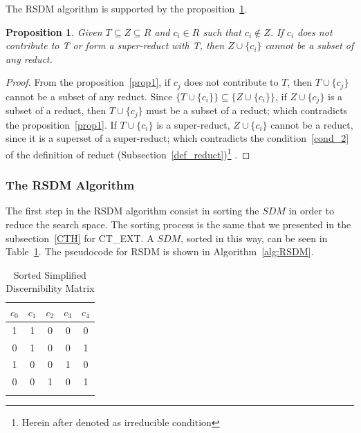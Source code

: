 \documentclass[authoryear,11pt]{elsarticle}
\newtheorem{proposition}{Proposition}
\newtheorem{proof}{Proof}
\begin{document}
	The RSDM algorithm is supported by the proposition~\ref{prop3}.		
	
	\begin{proposition}\label{prop3} 
		Given $T \subseteq Z \subseteq R$ and  $c_i \in R$ such that $c_i \notin Z$. If 
		$c_i$ does not contribute to T or form a super-reduct with T, then $Z\cup\{c_i\}$ cannot be a subset of any 
		reduct.
	\end{proposition}	
	
	\begin{proof}
		From the proposition~\ref{prop1}, if $c_j$ does not contribute to $T$, then $T\cup\{c_j\}$ cannot be a subset 
		of any reduct. Since $\lbrace T \cup \lbrace c_i \rbrace\rbrace \subseteq \lbrace Z \cup \lbrace c_i
		\rbrace\rbrace$, if $Z\cup\{c_j\}$ is a subset of a reduct, then $T\cup\{c_j\}$ must be a subset of a 
		reduct; which contradicts the proposition~\ref{prop1}.
		If $T \cup \lbrace c_i \rbrace$ is a super-reduct, $ Z \cup \lbrace c_i \rbrace$ cannot be a 
		reduct, since it is a superset of a super-reduct; which contradicts the condition~\ref{cond_2} of the
		definition of reduct (Subsection~\ref{def_reduct})\footnote{Herein after denoted as irreducible condition} .
	\end{proof}


\subsubsection{The RSDM Algorithm}
%
	The first step in the RSDM algorithm consist in sorting the $SDM$ in order to reduce the search space. 
	The sorting process is the same that we presented in the subsection~\ref{CTH} for CT\_EXT. A $SDM$, sorted in 
	this way, can be seen in Table~\ref{tab:SDM}. The pseudocode for RSDM is shown in Algorithm~\ref{alg:RSDM}. 
	
	\begin{table}[!htb]
      \centering
        \caption{Sorted Simplified Discernibility Matrix}
        \begin{tabular}{ccccc}\label{tab:SDM}
            $c_0$ & $c_1$ & $c_2$ & $c_3$ & $c_4$\\
        		\hline
        		1&1&0&0&0\\
        		0&1&0&0&1\\
        		1&0&0&1&0\\
        		0&0&1&0&1\\
        		\\
        \end{tabular} 
	\end{table}	
	
\end{document}
